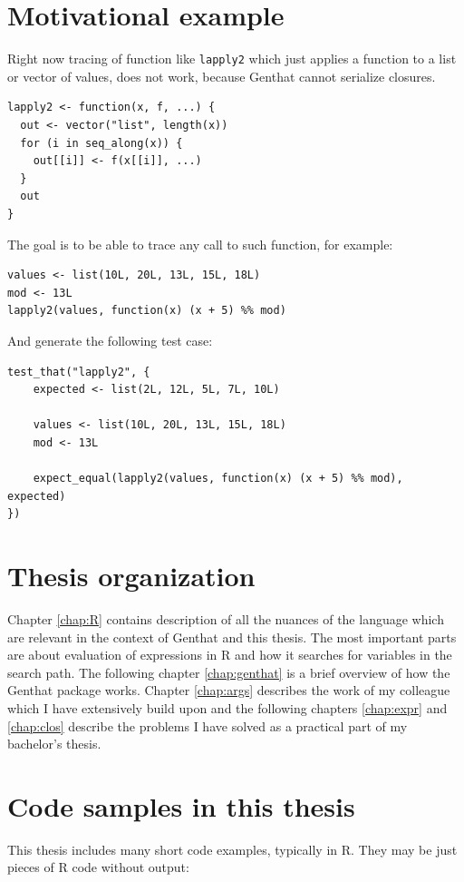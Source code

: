 \documentclass[thesis=B,english]{FITthesis}[2012/10/20]
\begin{document}
\section{Motivational example}
Right now tracing of function like \verb|lapply2|\cite{advR} which just applies a function to a list or vector of values, does not work, because Genthat cannot serialize closures.

\begin{verbatim}
lapply2 <- function(x, f, ...) {
  out <- vector("list", length(x))
  for (i in seq_along(x)) {
    out[[i]] <- f(x[[i]], ...)
  }
  out
}
\end{verbatim}

The goal is to be able to trace any call to such function, for example:

\begin{verbatim}
values <- list(10L, 20L, 13L, 15L, 18L)
mod <- 13L
lapply2(values, function(x) (x + 5) %% mod)
\end{verbatim}

And generate the following test case:

\begin{verbatim}
test_that("lapply2", {
    expected <- list(2L, 12L, 5L, 7L, 10L)

    values <- list(10L, 20L, 13L, 15L, 18L)
    mod <- 13L

    expect_equal(lapply2(values, function(x) (x + 5) %% mod), expected)
})
\end{verbatim}



\section{Thesis organization}
 Chapter \ref{chap:R} contains description of all the nuances of the language which are relevant in the context of Genthat and this thesis. The most important parts are about evaluation of expressions in R and how it searches for variables in the search path. The following chapter \ref{chap:genthat} is a brief overview of how the Genthat package works. Chapter \ref{chap:args} describes the work of my colleague which I have extensively build upon and the following chapters \ref{chap:expr} and \ref{chap:clos} describe the problems I have solved as a practical part of my bachelor’s thesis. 

\section{Code samples in this thesis}
This thesis includes many short code examples, typically in R. They may be just pieces of R code without output:
\end{document}
